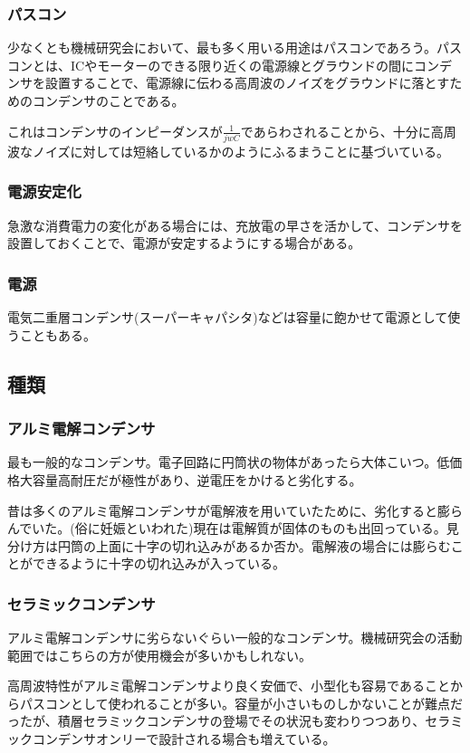 \documentclass[a4paper,titlepage,here]{ujarticle}
\begin{document}
\subsubsection{パスコン}
少なくとも機械研究会において、最も多く用いる用途はパスコンであろう。パスコンとは、ICやモーターのできる限り近くの電源線とグラウンドの間にコンデンサを設置することで、電源線に伝わる高周波のノイズをグラウンドに落とすためのコンデンサのことである。

これはコンデンサのインピーダンスが$\frac{1}{jwC}$であらわされることから、十分に高周波なノイズに対しては短絡しているかのようにふるまうことに基づいている。
\subsubsection{電源安定化}
急激な消費電力の変化がある場合には、充放電の早さを活かして、コンデンサを設置しておくことで、電源が安定するようにする場合がある。
\subsubsection{電源}
電気二重層コンデンサ(スーパーキャパシタ)などは容量に飽かせて電源として使うこともある。
\subsection{種類}
\subsubsection{アルミ電解コンデンサ}
最も一般的なコンデンサ。電子回路に円筒状の物体があったら大体こいつ。低価格大容量高耐圧だが極性があり、逆電圧をかけると劣化する。

昔は多くのアルミ電解コンデンサが電解液を用いていたために、劣化すると膨らんでいた。(俗に妊娠といわれた)現在は電解質が固体のものも出回っている。見分け方は円筒の上面に十字の切れ込みがあるか否か。電解液の場合には膨らむことができるように十字の切れ込みが入っている。
\subsubsection{セラミックコンデンサ}
アルミ電解コンデンサに劣らないぐらい一般的なコンデンサ。機械研究会の活動範囲ではこちらの方が使用機会が多いかもしれない。

高周波特性がアルミ電解コンデンサより良く安価で、小型化も容易であることからパスコンとして使われることが多い。容量が小さいものしかないことが難点だったが、積層セラミックコンデンサの登場でその状況も変わりつつあり、セラミックコンデンサオンリーで設計される場合も増えている。
\end{document}
